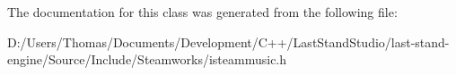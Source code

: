 The documentation for this class was generated from the following file\+:\begin{DoxyCompactItemize}
\item 
D\+:/\+Users/\+Thomas/\+Documents/\+Development/\+C++/\+Last\+Stand\+Studio/last-\/stand-\/engine/\+Source/\+Include/\+Steamworks/isteammusic.\+h\end{DoxyCompactItemize}
